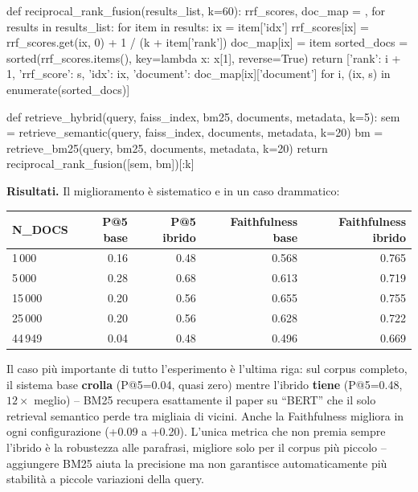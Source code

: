 \documentclass[11pt,a4paper]{article}
\begin{document}
\begin{pylisting}[title={Reciprocal Rank Fusion: unire due ranking senza calibrare i punteggi}]
def reciprocal_rank_fusion(results_list, k=60):
    rrf_scores, doc_map = {}, {}
    for results in results_list:
        for item in results:
            ix = item['idx']
            rrf_scores[ix] = rrf_scores.get(ix, 0) + 1 / (k + item['rank'])
            doc_map[ix] = item
    sorted_docs = sorted(rrf_scores.items(), key=lambda x: x[1], reverse=True)
    return [{'rank': i + 1, 'rrf_score': s, 'idx': ix,
             'document': doc_map[ix]['document']}
            for i, (ix, s) in enumerate(sorted_docs)]

def retrieve_hybrid(query, faiss_index, bm25, documents, metadata, k=5):
    sem = retrieve_semantic(query, faiss_index, documents, metadata, k=20)
    bm  = retrieve_bm25(query, bm25, documents, metadata, k=20)
    return reciprocal_rank_fusion([sem, bm])[:k]
\end{pylisting}

\textbf{Risultati.} Il miglioramento è sistematico e in un caso drammatico:

\begin{center}
\small
\begin{tabular}{lrrrr}
\toprule
\textbf{N\_DOCS} & \textbf{P@5 base} & \textbf{P@5 ibrido} & \textbf{Faithfulness base} & \textbf{Faithfulness ibrido} \\
\midrule
1\,000  & 0.16 & 0.48 & 0.568 & 0.765 \\
5\,000  & 0.28 & 0.68 & 0.613 & 0.719 \\
15\,000 & 0.20 & 0.56 & 0.655 & 0.755 \\
25\,000 & 0.20 & 0.56 & 0.628 & 0.722 \\
44\,949 & 0.04 & 0.48 & 0.496 & 0.669 \\
\bottomrule
\end{tabular}
\end{center}

Il caso più importante di tutto l'esperimento è l'ultima riga: sul corpus completo, il sistema base \textbf{crolla} (P@5=0.04, quasi zero) mentre l'ibrido \textbf{tiene} (P@5=0.48, $12\times$ meglio) -- BM25 recupera esattamente il paper su ``BERT'' che il solo retrieval semantico perde tra migliaia di vicini. Anche la Faithfulness migliora in ogni configurazione (+0.09 a +0.20). L'unica metrica che non premia sempre l'ibrido è la robustezza alle parafrasi, migliore solo per il corpus più piccolo -- aggiungere BM25 aiuta la precisione ma non garantisce automaticamente più stabilità a piccole variazioni della query.
\end{document}
